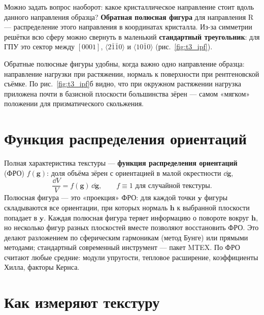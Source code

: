 Можно задать вопрос наоборот: какое кристаллическое направление стоит вдоль данного направления образца?
\textbf{Обратная полюсная фигура} для направления R --- распределение этого направления в координатах кристалла. Из-за
симметрии решётки всю сферу можно свернуть в маленький \textbf{стандартный треугольник}: для ГПУ это сектор между
$[0001]$, $\langle2\bar1\bar10\rangle$ и $\langle10\bar10\rangle$ (рис.~\ref{fig:t3_ipf}).


Обратные полюсные фигуры удобны, когда важно одно направление образца: направление нагрузки при растяжении, нормаль к
поверхности при рентгеновской съёмке. По рис.~\ref{fig:t3_ipf}б видно, что при окружном растяжении нагрузка
приложена почти в базисной плоскости большинства зёрен --- самом «мягком» положении для призматического скольжения.

\section{Функция распределения ориентаций}

Полная характеристика текстуры --- \textbf{функция распределения ориентаций} (ФРО) $f(\mathbf g)$: доля объёма
зёрен с ориентацией в малой окрестности $\dd\mathbf g$,
\begin{equation}
\frac{\dd V}{V} = f(\mathbf g)\,\dd\mathbf g,\qquad f\equiv1 \text{ для случайной текстуры}.
\end{equation}
Полюсная фигура --- это «проекция» ФРО: для каждой точки $\mathbf y$ фигуры складываются все ориентации, при которых
нормаль $\mathbf h$ к выбранной плоскости попадает в $\mathbf y$. Каждая полюсная фигура теряет информацию о
повороте вокруг $\mathbf h$, но несколько фигур разных плоскостей вместе позволяют восстановить ФРО. Это делают
разложением по сферическим гармоникам (метод Бунге) или прямыми методами; стандартный современный инструмент ---
пакет MTEX. По ФРО считают любые средние: модули упругости, тепловое расширение, коэффициенты Хилла, факторы Кернса.

\section{Как измеряют текстуру}

